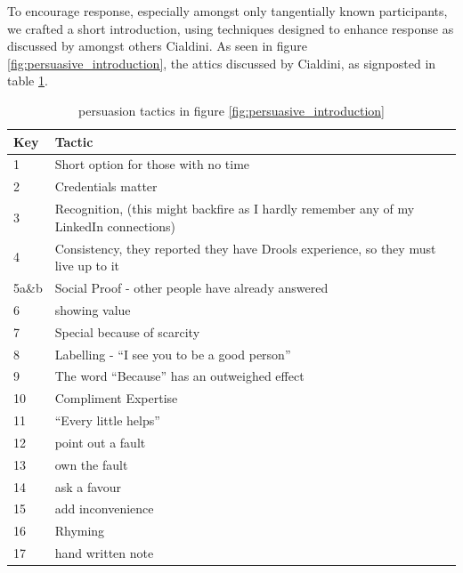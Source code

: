 To encourage response, especially amongst only tangentially known participants, we crafted a short introduction, using techniques designed to enhance response as discussed by amongst others Cialdini\cite{goldstein2008yes}.
As seen in figure \ref{fig:persuasive_introduction}, the attics discussed by Cialdini, as signposted in table \ref{table:persuasive_introduction}.
\begin{table}[h]
    \begin{center}
        \begin{tabular}{ |l | l |  } 
            \hline
            Key &  Tactic\\
            \hline
            1  & Short option for those with no time \\
            2  & Credentials matter \\
            3  & Recognition, (this might backfire as I hardly remember any of my LinkedIn connections) \\
            4  & Consistency, they reported they have Drools experience, so they must live up to it \\
            5a\&b  & Social Proof - other people have already answered \\
            6  & showing value \\
            7  & Special because of scarcity \\
            8  & Labelling - ``I see you to be a good person'' \\
            9  & The word ``Because'' has an outweighed effect \\
            10 & Compliment Expertise \\
            11 & ``Every little helps'' \\
            12 & point out a fault \\
            13 & own the fault \\
            14 & ask a favour \\
            15 & add inconvenience \\
            16 & Rhyming \\
            17 & hand written note \\
            \hline
        \end{tabular}
    \end{center}
    \caption{persuasion tactics in figure \ref{fig:persuasive_introduction}}
    \label{table:persuasive_introduction}
\end{table}

